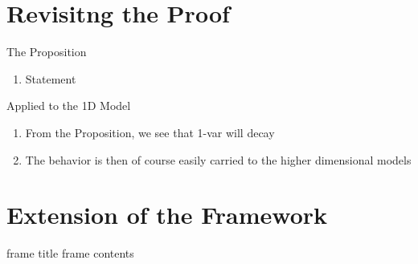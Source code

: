 \documentclass[aspectratio=169,  notheorems, sOuRcEs]{RUCPresentation}
\begin{document}
\section{Revisitng the Proof}
\begin{frame}{The Proposition}

    \begin{enumerate}
        \item Statement
    \end{enumerate}

\end{frame}

\begin{frame}{Applied to the 1D Model}

    \begin{enumerate}
        \item From the Proposition, we see that 1-var will decay
        \item The behavior is then of course easily carried to the higher
            dimensional models
    \end{enumerate}

\end{frame}


\section{Extension of the Framework}
\begin{frame}{frame title}
    frame contents
\end{frame}
\end{document}
